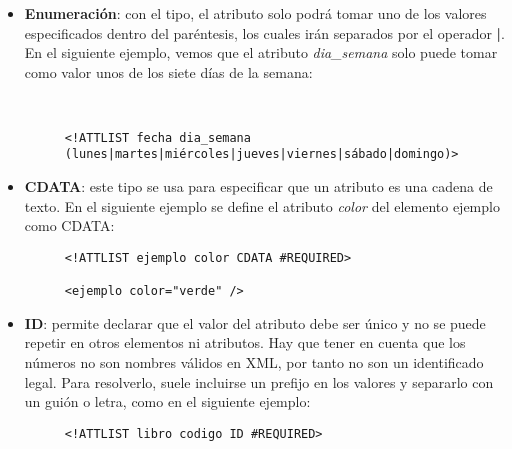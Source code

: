 \begin{itemize}
    \item \textbf{Enumeración}:  con el tipo, el atributo solo podrá tomar uno de los valores especificados dentro del paréntesis, los cuales irán separados por el operador \textbf{|}. En el siguiente ejemplo, vemos que el atributo \textit{dia\_semana} solo puede tomar como valor unos de los siete días de la semana:

     \begin{figure}[H]
        \begin{tcolorbox}[sharp corners, colback=yellow!30, colframe=white!20]
            \scriptsize
            \begin{verbatim}


<!ATTLIST fecha dia_semana (lunes|martes|miércoles|jueves|viernes|sábado|domingo)>
            \end{verbatim}
        \end{tcolorbox}
    \end{figure}

    \item \textbf{CDATA}: este tipo se usa para especificar que un atributo es una cadena de texto. En el siguiente ejemplo se define el atributo \textit{color} del elemento ejemplo como CDATA:

     \begin{figure}[H]
        \begin{tcolorbox}[sharp corners, colback=yellow!30, colframe=white!20]
            \scriptsize
            \begin{verbatim}
<!ATTLIST ejemplo color CDATA #REQUIRED>

<ejemplo color="verde" />
            \end{verbatim}
        \end{tcolorbox}
    \end{figure}


    \item \textbf{ID}: permite declarar que el valor del atributo debe ser único y no se puede repetir en otros elementos ni atributos. Hay que tener en cuenta que los números no son nombres válidos en XML, por tanto no son un identificado legal.  Para resolverlo, suele incluirse un prefijo en los valores y separarlo con un guión o letra, como en el siguiente ejemplo:

    \begin{figure}[H]
        \begin{tcolorbox}[sharp corners, colback=yellow!30, colframe=white!20]
            \scriptsize
            \begin{verbatim}
<!ATTLIST libro codigo ID #REQUIRED>


\end{verbatim}
\end{tcolorbox}
\end{figure}
\end{itemize}
